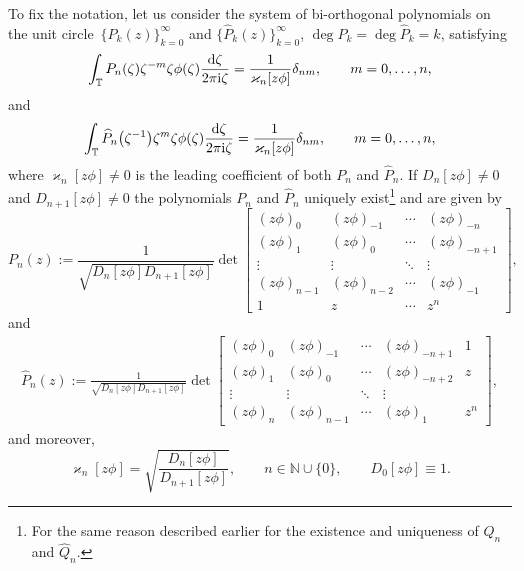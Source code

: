 \documentclass[10pt,a4paper]{amsart}
\numberwithin{equation}{section}
\newcommand{\N}{{\mathbb N}}
\newcommand{\T}{{\mathbb T}}
\newcommand{\de}{\delta}
\newcommand{\ze}{\zeta}
\newcommand{\ii}{{\rm i}}
\newcommand{\dd}{{\rm d}}
\begin{document}
	To fix the notation, let us consider the system of bi-orthogonal polynomials on the unit circle~$\{P_k(z)\}^{\infty}_{k=0}$ and $\big\{\widehat{P}_k(z)\big\}^{\infty}_{k=0}$, $\deg P_k = \deg \widehat{P}_k = k$, satisfying
	\begin{equation}\label{orth zphi}
		\int_{\T} P_n(\ze)\ze^{-m}\ze\phi(\ze)\frac{\dd \ze}{2\pi \ii \ze}= \frac{1}{\varkappa_n[z\phi]} \de_{nm}, \qquad m =0, \dots,n,
	\end{equation}
	and
	\[
		\int_{\T} \widehat{P}_n\big(\ze^{-1}\big)\ze^{m}\ze\phi(\ze)\frac{\dd \ze}{2\pi \ii \ze}=\frac{1}{\varkappa_n[z\phi]} \de_{nm}, \qquad m =0, \dots,n,
	\]
	where $\varkappa_n[z\phi] \neq 0$ is the leading coefficient of both $P_n$ and $\widehat{P}_n$. If $D_n[z\phi] \neq 0$ and $D_{n+1}[z\phi] \neq 0$ the polynomials $P_n$ and $\widehat{P}_n$ uniquely exist\footnote{For the same reason described earlier for the existence and uniqueness of $Q_n$ and $\widehat{Q}_n$.} and are given by
	\begin{equation}\label{Toeplitz OP zphi}
		P_n(z):= \frac{1}{\sqrt{D_n[z\phi] D_{n+1}[z\phi]}} \det \begin{bmatrix}
			(z\phi)_0 & (z\phi)_{-1} & \cdots & (z\phi)_{-n} \\
			(z\phi)_1 & (z\phi)_{0} & \cdots & (z\phi)_{-n+1} \\
			\vdots & \vdots & \ddots & \vdots \\
			(z\phi)_{n-1} & (z\phi)_{n-2} & \cdots & (z\phi)_{-1} \\
			1 & z & \cdots & z^n
		\end{bmatrix},
	\end{equation}
	and
	\begin{gather*}%
		\widehat{P}_n(z) := \frac{1}{\sqrt{D_n[z\phi] D_{n+1}[z\phi]}} \det \begin{bmatrix}
			(z\phi)_0 & (z\phi)_{-1} & \cdots & (z\phi)_{-n+1} & 1 \\
			(z\phi)_1 & (z\phi)_{0} & \cdots & (z\phi)_{-n+2} & z \\
			\vdots & \vdots & \ddots & \vdots \\
			(z\phi)_{n} & (z\phi)_{n-1} & \cdots & (z\phi)_{1} & z^n
		\end{bmatrix},
	\end{gather*}
	and moreover,
	\begin{equation}\label{kappa zphi}
		\varkappa_n[z\phi] = \sqrt{\frac{D_{n}[z\phi]}{D_{n+1}[z\phi]}}, \qquad n \in \N \cup \{0\}, \qquad D_0[z\phi] \equiv 1.
	\end{equation}
	
\end{document}
